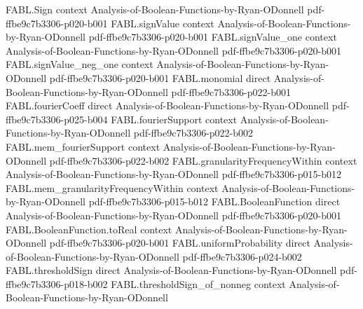\begin{theorem}
\label{FABL.two_mul_positiveProbability_mul_logb_inv_le_totalInfluence}
\leanok
{}
\proofstep
  {FABL.Sign}
  {context}
  {Analysis-of-Boolean-Functions-by-Ryan-ODonnell}
  {pdf-ffbe9c7b3306-p020-b001}
\proofstep
  {FABL.signValue}
  {context}
  {Analysis-of-Boolean-Functions-by-Ryan-ODonnell}
  {pdf-ffbe9c7b3306-p020-b001}
\proofstep
  {FABL.signValue_one}
  {context}
  {Analysis-of-Boolean-Functions-by-Ryan-ODonnell}
  {pdf-ffbe9c7b3306-p020-b001}
\proofstep
  {FABL.signValue_neg_one}
  {context}
  {Analysis-of-Boolean-Functions-by-Ryan-ODonnell}
  {pdf-ffbe9c7b3306-p020-b001}
\proofstep
  {FABL.monomial}
  {direct}
  {Analysis-of-Boolean-Functions-by-Ryan-ODonnell}
  {pdf-ffbe9c7b3306-p022-b001}
\proofstep
  {FABL.fourierCoeff}
  {direct}
  {Analysis-of-Boolean-Functions-by-Ryan-ODonnell}
  {pdf-ffbe9c7b3306-p025-b004}
\proofstep
  {FABL.fourierSupport}
  {context}
  {Analysis-of-Boolean-Functions-by-Ryan-ODonnell}
  {pdf-ffbe9c7b3306-p022-b002}
\proofstep
  {FABL.mem_fourierSupport}
  {context}
  {Analysis-of-Boolean-Functions-by-Ryan-ODonnell}
  {pdf-ffbe9c7b3306-p022-b002}
\proofstep
  {FABL.granularityFrequencyWithin}
  {context}
  {Analysis-of-Boolean-Functions-by-Ryan-ODonnell}
  {pdf-ffbe9c7b3306-p015-b012}
\proofstep
  {FABL.mem_granularityFrequencyWithin}
  {context}
  {Analysis-of-Boolean-Functions-by-Ryan-ODonnell}
  {pdf-ffbe9c7b3306-p015-b012}
\proofstep
  {FABL.BooleanFunction}
  {direct}
  {Analysis-of-Boolean-Functions-by-Ryan-ODonnell}
  {pdf-ffbe9c7b3306-p020-b001}
\proofstep
  {FABL.BooleanFunction.toReal}
  {context}
  {Analysis-of-Boolean-Functions-by-Ryan-ODonnell}
  {pdf-ffbe9c7b3306-p020-b001}
\proofstep
  {FABL.uniformProbability}
  {direct}
  {Analysis-of-Boolean-Functions-by-Ryan-ODonnell}
  {pdf-ffbe9c7b3306-p024-b002}
\proofstep
  {FABL.thresholdSign}
  {direct}
  {Analysis-of-Boolean-Functions-by-Ryan-ODonnell}
  {pdf-ffbe9c7b3306-p018-b002}
\proofstep
  {FABL.thresholdSign_of_nonneg}
  {context}
  {Analysis-of-Boolean-Functions-by-Ryan-ODonnell}

\end{theorem}
